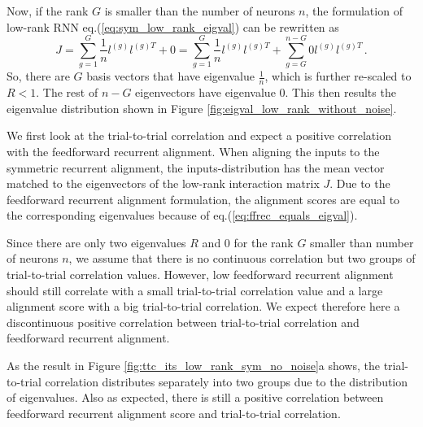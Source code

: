 \documentclass[11pt]{article}
\begin{document}
	Now, if the rank $G$ is smaller than the number of neurons $n$, the formulation of low-rank RNN eq.(\ref{eq:sym_low_rank_eigval}) can be rewritten as 
		\begin{equation} \label{eq:sym_low_rank_without_noise_eigval}
			J = \sum_{g =1}^{G} \frac{1}{n} l^{(g)} l^{(g)T} + 0 = \sum_{g =1}^{G} \frac{1}{n} l^{(g)} l^{(g)T} + \sum_{g =G}^{n-G} 0 l^{(g)} l^{(g)T} \, .
		\end{equation}
	So, there are $G$ basis vectors that have eigenvalue $\frac{1}{n}$, which is further re-scaled to $R < 1$. The rest of $n-G$ eigenvectors have eigenvalue $0$. This then results the eigenvalue distribution shown in Figure \ref{fig:eigval_low_rank_without_noise}. 
	
	We first look at the trial-to-trial correlation and expect a positive correlation with the feedforward recurrent alignment. When aligning the inputs to the symmetric recurrent alignment, the inputs-distribution has the mean vector matched to the eigenvectors of the low-rank interaction matrix $J$. Due to the feedforward recurrent alignment formulation, the alignment scores are equal to the corresponding eigenvalues because of eq.(\ref{eq:ffrec_equals_eigval}). 
	
	Since there are only two eigenvalues $R$ and $0$ for the rank $G$ smaller than number of neurons $n$, we assume that there is no continuous correlation but two groups of trial-to-trial correlation values. However, low feedforward recurrent alignment should still correlate with a small trial-to-trial correlation value and a large alignment score with a big trial-to-trial correlation. We expect therefore here a discontinuous positive correlation between trial-to-trial correlation and feedforward recurrent alignment. 
	
	As the result in Figure \ref{fig:ttc_its_low_rank_sym_no_noise}a shows, the trial-to-trial correlation distributes separately into two groups due to the distribution of eigenvalues. Also as expected, there is still a positive correlation between feedforward recurrent alignment score and trial-to-trial correlation.
	
\end{document}

